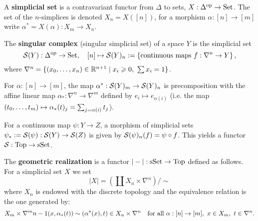 A \textbf{simplicial set} is a contravariant functor from $\Delta$ to sets, $X:\Delta^\op \to\Set$. The set of the $n$-simplices is denoted $X_n=X([n])$, for a morphism $\alpha:[n]\to[m]$ write $\alpha^*=X(\alpha):X_m\to X_n$.

The \textbf{singular complex} (singular simplicial set) of a space $Y$ is the simplicial set
\[\S(Y):\Delta^\op \to\Set, \quad [n] \mapsto \S(Y)_n :=\left\{\text{continuous maps }f:\nabla^n \to Y\right\},\]
where $\nabla^n=\{(\xso)\in\R^{n+1}\mid x_i\geq0,\ \sum x_i=1\}$.

For $\alpha: [n]\to [m]$, the map $\alpha^*:\S(Y)_m\to\S(Y)_n$ is precomposition with the affine linear map $\alpha_*:\nabla^n\to\nabla^m$ defined by $e_i\mapsto e_{\alpha(i)}$ (i.e. the map $(\nno{t}{m})\mapsto\alpha_*(t)_j=\sum_{j=\alpha(i)}t_j$).

For a continuous map $\psi:Y\to Z$, a morphism of simplicial sets $\psi_*:=\S(\psi):\S(Y)\to\S(Z)$ is given by $\S(\psi)_n(f)=\psi\circ f$. This yields a functor $\S:\Top\to\sSet$.

The \textbf{geometric realization} is a functor $|-|:\sSet\to\Top$ defined as follows. For a simplicial set $X$ we set
\[|X|=\left(\coprod X_n\times\nabla^n\right)/\sim\]
where $X_n$ is endowed with the discrete topology and the equivalence relation is the one generated by:\normalmarginpar{}
\[X_m\times\nabla^m\cont(x,\alpha_*(t))\sim(\alpha^*(x),t)\in X_n\times\nabla^n\quad\text{for all }\alpha:[n]\to[m],\ x\in X_m,\ t\in\nabla^n.\]

\reversemarginpar
